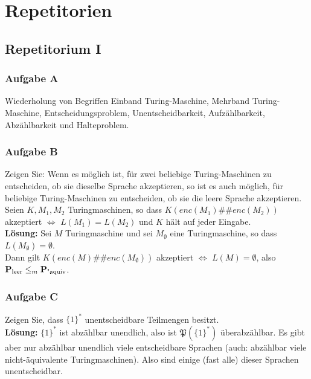 \section{Repetitorien}

\subsection{Repetitorium I}
\subsubsection*{Aufgabe A}
    Wiederholung von Begriffen Einband Turing-Maschine, Mehrband Turing-Maschine, Entscheidungsproblem, Unentscheidbarkeit, Aufzählbarkeit, Abzählbarkeit und Halteproblem.

\subsubsection*{Aufgabe B}
    Zeigen Sie: Wenn es möglich ist, für zwei beliebige Turing-Maschinen zu entscheiden, ob sie dieselbe Sprache akzeptieren, so ist es auch möglich, für beliebige Turing-Maschinen zu entscheiden, ob sie die leere Sprache akzeptieren. Seien $K, M_1, M_2$ Turingmaschinen, so dass $K(enc(M_1)\#\#enc(M_2))$ akzeptiert $\Leftrightarrow$ $L(M_1) = L(M_2)$ und $K$ hält auf jeder Eingabe. \\
    \textbf{Lösung:} Sei $M$ Turingmaschine und sei $M_\emptyset$ eine Turingmaschine, so dass $L(M_\emptyset) = \emptyset$. \\
    Dann gilt $K(enc(M)\#\#enc(M_\emptyset))$ akzeptiert $\Leftrightarrow$ $L(M) = \emptyset$, also $\textbf{P}_{\text{leer}} \leq_{m} \textbf{P}_{\text{"aquiv}}$.

\subsubsection*{Aufgabe C}
    Zeigen Sie, dass $\{1\}^*$ unentscheidbare Teilmengen besitzt. \\
    \textbf{Lösung:} $\{1\}^*$ ist abzählbar unendlich, also ist $\mathfrak{P}(\{1\}^*)$ überabzählbar. Es gibt aber nur abzählbar unendlich viele entscheidbare Sprachen (auch: abzählbar viele nicht-äquivalente Turingmaschinen). Also sind einige (fast alle) dieser Sprachen unentscheidbar.


